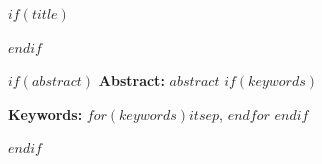 $if(title)$
\maketitle
$endif$

\renewenvironment{abstract}
 {\small\noindent\textbf{Abstract:}}
 {\par}

$if(abstract)$
  \begin{abstract}
    $abstract$
    $if(keywords)$
      \par\bigskip
      \noindent\textbf{Keywords:} $for(keywords)$$it$$sep$, $endfor$
    $endif$
  \end{abstract}
$endif$

\newpage


\linenumbers
\doublespacing %

\makeatletter
{}%
\makeatother